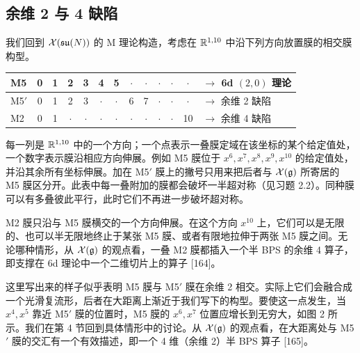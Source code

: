 \subsection{余维 2 与 4 缺陷}

我们回到 $\mathcal{X}(\mathfrak{su}(N))$ 的 M 理论构造，考虑在 $\mathbb{R}^{1,10}$ 中沿下列方向放置膜的相交膜构型。

\begin{center}
\begin{tabular}{l*{11}{c}l}
\toprule
M5 & 0 & 1 & 2 & 3 & 4 & 5 & $\cdot$ & $\cdot$ & $\cdot$ & $\cdot$ & $\cdot$ & $\to$ 6d $(2,0)$ 理论 \\
\midrule
M5$'$ & 0 & 1 & 2 & 3 & $\cdot$ & $\cdot$ & 6 & 7 & $\cdot$ & $\cdot$ & $\cdot$ & $\to$ 余维 2 缺陷 \\
M2 & 0 & 1 & $\cdot$ & $\cdot$ & $\cdot$ & $\cdot$ & $\cdot$ & $\cdot$ & $\cdot$ & $\cdot$ & 10 & $\to$ 余维 4 缺陷 \\
\bottomrule
\end{tabular}
\end{center}

每一列是 $\mathbb{R}^{1,10}$ 中的一个方向；一个点表示一叠膜定域在该坐标的某个给定值处，一个数字表示膜沿相应方向伸展。例如 M5 膜位于 $x^6,x^7,x^8,x^9,x^{10}$ 的给定值处，并沿其余所有坐标伸展。加在 M5$'$ 膜上的撇号只用来把后者与 $\mathcal{X}(\mathfrak{g})$ 所寄居的 M5 膜区分开。此表中每一叠附加的膜都会破坏一半超对称（见习题 2.2）。同种膜可以有多叠彼此平行，此时它们不再进一步破坏超对称。

M2 膜只沿与 M5 膜横交的一个方向伸展。在这个方向 $x^{10}$ 上，它们可以是无限的、也可以半无限地终止于某张 M5 膜、或者有限地拉伸于两张 M5 膜之间。无论哪种情形，从 $\mathcal{X}(\mathfrak{g})$ 的观点看，一叠 M2 膜都插入一个半 BPS 的余维 4 算子，即支撑在 6d 理论中一个二维切片上的算子 [164]。


这里写出来的样子似乎表明 M5 膜与 M5$'$ 膜在余维 2 相交。实际上它们会融合成一个光滑复流形，后者在大距离上渐近于我们写下的构型。要使这一点发生，当 $x^4,x^5$ 靠近 M5$'$ 膜的位置时，M5 膜的 $x^6,x^7$ 位置应增长到无穷大，如图 2 所示。我们在第 4 节回到具体情形中的讨论。从 $\mathcal{X}(\mathfrak{g})$ 的观点看，在大距离处与 M5$'$ 膜的交汇有一个有效描述，即一个 4 维（余维 2）半 BPS 算子 [165]。

